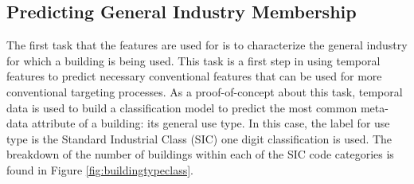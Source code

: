 \subsection{Predicting General Industry Membership}
\label{sec:predictinsiccode}

The first task that the features are used for is to characterize the general industry for which a building is being used. This task is a first step in using temporal features to predict necessary conventional features that can be used for more conventional targeting processes. As a proof-of-concept about this task, temporal data is used to build a classification model to predict the most common meta-data attribute of a building: its general use type. In this case, the label for use type is the Standard Industrial Class (SIC) one digit classification is used. The breakdown of the number of buildings within each of the SIC code categories is found in Figure \ref{fig:buildingtypeclass}.




